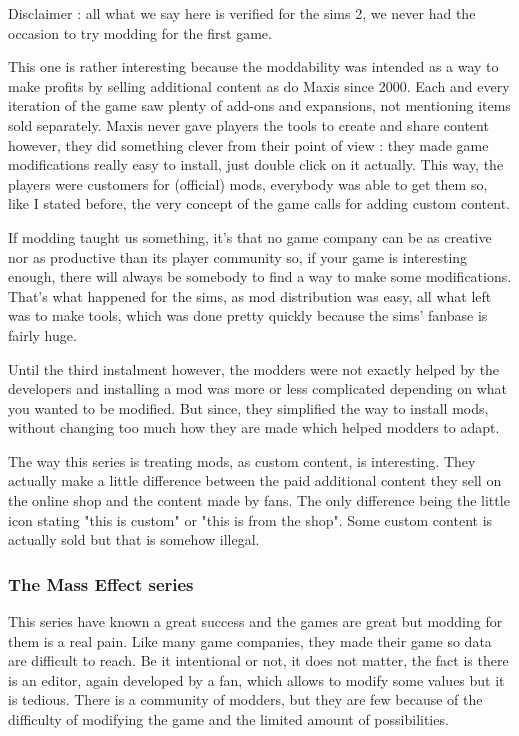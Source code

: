 \documentclass[a4paper,12pt]{article}
\begin{document}
Disclaimer : all what we say here is verified for the sims 2, we never had the occasion to try modding for the first game.

This one is rather interesting because the moddability was intended as a way to make profits by selling additional content as do Maxis since 2000. Each and every iteration of the game saw plenty of add-ons and expansions, not mentioning items sold separately. Maxis never gave players the tools to create and share content however, they did something clever from their point of view : they made game modifications really easy to install, just double click on it actually. This way, the players were customers for (official) mods, everybody was able to get them so, like I stated before, the very concept of the game calls for adding custom content.

If modding taught us something, it's that no game company can be as creative nor as productive than its player community so, if your game is interesting enough, there will always be somebody to find a way to make some modifications. That's what happened for the sims, as mod distribution was easy, all what left was to make tools, which was done pretty quickly because the sims' fanbase is fairly huge.

Until the third instalment however, the modders were not exactly helped by the developers and installing a mod was more or less complicated depending on what you wanted to be modified. But since, they simplified the way to install mods, without changing too much how they are made which helped modders to adapt.

The way this series is treating mods, as custom content, is interesting. They actually make a little difference between the paid additional content they sell on the online shop and the content made by fans. The only difference being the little icon stating "this is custom" or "this is from the shop". Some custom content is actually sold but that is somehow illegal.

\subsubsection{The Mass Effect series}

This series have known a great success and the games are great but modding for them is a real pain. Like many game companies, they made their game so data are difficult to reach. Be it intentional or not, it does not matter, the fact is there is an editor, again developed by a fan, which allows to modify some values but it is tedious. There is a community of modders, but they are few because of the difficulty of modifying the game and the limited amount of possibilities.
\end{document}
